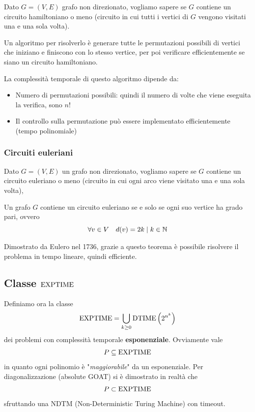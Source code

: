 Dato $G = (V,E)$ grafo non direzionato, vogliamo sapere se $G$ contiene un circuito hamiltoniano o meno (circuito in cui tutti i vertici di $G$ vengono visitati una e una sola volta).

Un algoritmo per risolverlo è generare tutte le permutazioni possibili di vertici che iniziano e finiscono con lo stesso vertice, per poi verificare efficientemente se siano un circuito hamiltoniano.

La complessità temporale di questo algoritmo dipende da: 
\begin{itemize}
	\item Numero di permutazioni possibili: quindi il numero di volte che viene eseguita la verifica, sono $n!$
    
	\item Il controllo sulla permutazione può essere implementato efficientemente (tempo polinomiale)
\end{itemize}

\subsubsection{Circuiti euleriani}

Dato $G = (V,E)$ un grafo non direzionato, vogliamo sapere se $G$ contiene un circuito euleriano o meno (circuito in cui ogni arco viene visitato una e una sola volta),\\

\begin{theor}
	Un grafo $G$ contiene un circuito euleriano se e solo se ogni suo vertice ha grado pari, ovvero
	$$ \forall v \in V \quad d(v) = 2k \mid k \in \mathbb{N} $$
\end{theor}

Dimostrato da Eulero nel 1736, grazie a questo teorema è possibile risolvere il problema in tempo lineare, quindi efficiente.

\subsection{Classe $\text{EXPTIME}$}

Definiamo ora la classe
$$ \text{EXPTIME} = \bigcup_{k \geq 0} \text{DTIME} \left(2^{n^k}\right)$$
dei problemi con complessità temporale \textbf{esponenziale}. Ovviamente vale
$$ P \subseteq \text{EXPTIME} $$
in quanto ogni polinomio è "\textit{maggiorabile}" da un esponenziale. Per diagonalizzazione (absolute GOAT) si è dimostrato in realtà che
$$ P \subset \text{EXPTIME} $$
sfruttando una NDTM (Non-Deterministic Turing Machine) con timeout.

